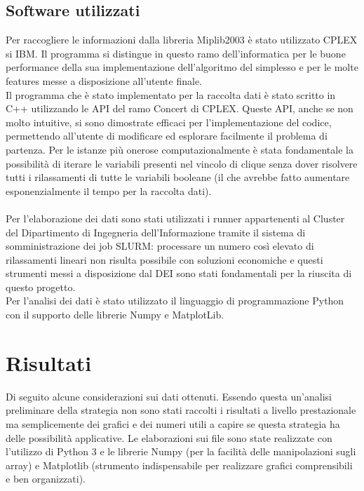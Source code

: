 \documentclass[12pt,a4paper,twoside,openright]{book}
\begin{document}
\section{Software utilizzati}
Per raccogliere le informazioni dalla libreria Miplib2003 è stato utilizzato CPLEX si IBM.
Il programma si distingue in questo ramo dell'informatica per le buone performance della 
sua implementazione dell'algoritmo del simplesso e per le molte features messe a 
disposizione all'utente finale.\\
Il programma che è stato implementato per la raccolta dati è stato scritto in C++ utilizzando 
le API del ramo Concert di CPLEX. Queste API, anche se non molto intuitive,
si sono dimostrate efficaci per l'implementazione del codice, permettendo all'utente di 
modificare ed esplorare facilmente il problema di partenza. Per le istanze più onerose 
computazionalmente è stata fondamentale la possibilità di iterare le variabili presenti nel
vincolo di clique senza dover risolvere tutti i rilassamenti di tutte le variabili booleane 
(il che avrebbe fatto aumentare esponenzialmente il tempo per la raccolta dati).\\\\

Per l'elaborazione dei dati sono stati utilizzati i runner appartenenti al Cluster del Dipartimento di Ingegneria 
dell'Informazione tramite il sistema di somministrazione dei job SLURM: 
processare un numero così elevato di rilassamenti lineari non risulta possibile con soluzioni 
economiche e questi strumenti messi a disposizione dal DEI sono stati fondamentali per 
la riuscita di questo progetto.
\\
Per l'analisi dei dati è stato utilizzato il linguaggio di programmazione Python con il supporto delle 
librerie Numpy e MatplotLib.

\chapter{Risultati}
Di seguito alcune considerazioni sui dati ottenuti. Essendo questa un'analisi preliminare della strategia
non sono stati raccolti i risultati a livello prestazionale ma semplicemente dei grafici e dei numeri 
utili a capire se questa strategia ha delle possibilità applicative. Le elaborazioni sui file sono state
realizzate con l'utilizzo di Python 3 e le librerie Numpy (per la facilità delle manipolazioni sugli array)
e Matplotlib (strumento indispensabile per realizzare grafici comprensibili e ben organizzati).
\end{document}
